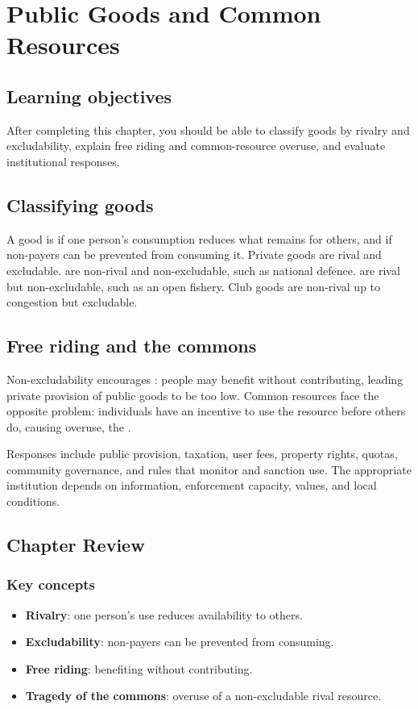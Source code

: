 \chapter{Public Goods and Common Resources}
\label{chap:public-goods}

\section{Learning objectives}

After completing this chapter, you should be able to classify goods by rivalry and excludability, explain free riding and common-resource overuse, and evaluate institutional responses.

\section{Classifying goods}

A good is  if one person's consumption reduces what remains for others, and  if non-payers can be prevented from consuming it. Private goods are rival and excludable.  are non-rival and non-excludable, such as national defence.  are rival but non-excludable, such as an open fishery. Club goods are non-rival up to congestion but excludable.

\section{Free riding and the commons}

Non-excludability encourages : people may benefit without contributing, leading private provision of public goods to be too low. Common resources face the opposite problem: individuals have an incentive to use the resource before others do, causing overuse, the .

Responses include public provision, taxation, user fees, property rights, quotas, community governance, and rules that monitor and sanction use. The appropriate institution depends on information, enforcement capacity, values, and local conditions.

\section*{Chapter Review}

\subsection*{Key concepts}
\begin{itemize}
  \item \textbf{Rivalry}: one person's use reduces availability to others.
  \item \textbf{Excludability}: non-payers can be prevented from consuming.
  \item \textbf{Free riding}: benefiting without contributing.
  \item \textbf{Tragedy of the commons}: overuse of a non-excludable rival resource.
\end{itemize}

